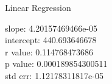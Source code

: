 \documentclass[final]{beamer}
\newlength{\onecolwid}
\newlength{\twocolwid}
\begin{document}
\begin{frame}[t]
\begin{columns}[t]
\begin{column}{\twocolwid}
\begin{columns}[t,totalwidth=\twocolwid]
\begin{column}{\onecolwid}
\begin{block}{Linear Regression}
\begin{center}

slope: 4.20157469466e-05 \\

intercept: 440.693646678 \\

r value: 0.114768473686 \\

p value: 0.000189854300511 \\

std err: 1.12178311817e-05 \\
\end{center}
\end{block}






\end{column} %

\end{columns} %




\begin{columns}[t,totalwidth=\twocolwid] %

\begin{column}{\onecolwid} %



\end{column} %

\begin{column}{\onecolwid} %




\end{column} %

\end{columns} %

\end{column} %


\end{columns}
\end{frame}
\end{document}
